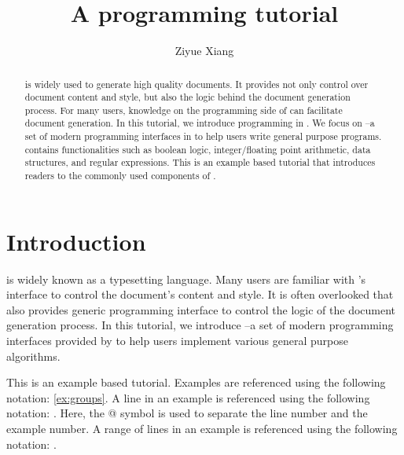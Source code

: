 \documentclass{ltugboat}
\title{A \LTT{} programming tutorial}
\author{Ziyue Xiang}
\begin{document}
\begin{abstract}
\LT{} is widely used to generate high quality documents.
It provides not only control over document content and style, but also the logic behind the document generation process.
For many users, knowledge on the programming side of \LT{} can facilitate document generation.
In this tutorial, we introduce programming in \LT{}.
We focus on \LTT{}--a set of modern programming interfaces in \LT{} to help users write general purpose programs.
\LTT{} contains functionalities such as boolean logic, integer/floating point arithmetic, data structures, and regular expressions.
This is an example based \LTT{} tutorial that introduces readers to the commonly used components of \LTT{}.
\end{abstract}

\maketitle

\tableofcontents
\ListOfCodeExample


\section{Introduction}

\LT{} is widely known as a typesetting language.
Many \LT{} users are familiar with \LT{}'s interface to control the document's content and style.
It is often overlooked that \LT{} also provides generic programming interface to control the logic of the document generation process.
In this tutorial, we introduce \LTT{}--a set of modern programming interfaces provided by \LT{} to help users implement various general purpose algorithms.

This is an example based tutorial. 
Examples are referenced using the following notation: \cref{ex:groups}.
A line in an example is referenced using the following notation: .
Here, the @ symbol is used to separate the line number and the example number.
A range of lines in an example is referenced using the following notation: .

\end{document}
